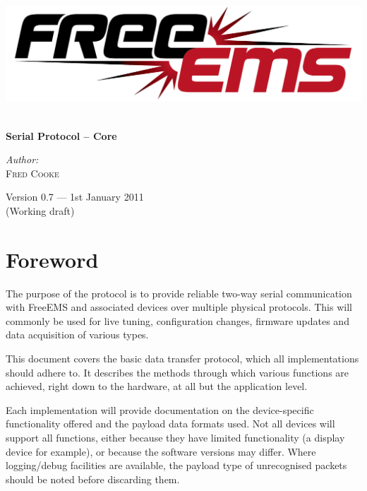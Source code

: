 \documentclass[12pt,a4wide,titlepage]{article}
\begin{document}
\begin{titlepage} 
\begin{center}

\includegraphics[width=1\textwidth]{./logos/freeems}\\[1cm] \vfill

\HRule \\[0.8cm]
{ \huge \bfseries Serial Protocol -- Core}\\[0.4cm]
\HRule \vfill

\Large \emph{Author:}\\
\textsc{Fred Cooke} \vfill

{\large Version 0.7 --- 1st January 2011\\
(Working draft)}



\section {Foreword}

The purpose of the protocol is to provide reliable two-way serial communication
with FreeEMS and associated devices over multiple physical protocols. This will
commonly be used for live tuning, configuration changes, firmware updates and
data acquisition of various types.

This document covers the basic data transfer protocol, which all
implementations should adhere to. It describes the methods through which
various functions are achieved, right down to the hardware, at all but the
application level.

Each implementation will provide documentation on the device-specific
functionality offered and the payload data formats used. Not all devices
will support all functions, either because they have limited functionality
(a display device for example), or because the software versions may differ.
Where logging/debug facilities are available, the payload type of unrecognised
packets should be noted before discarding them.


\end{center}
\end{titlepage}
\end{document}
